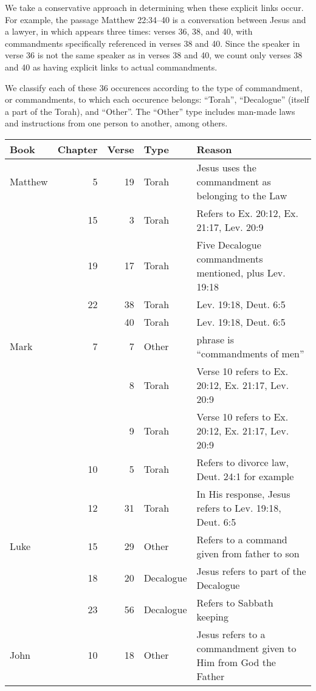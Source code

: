 \documentclass{article}
\newcommand{\entole}{\textepsilon\textnu\texttau\textomikron\textlambda\textepsilon\xspace}
\begin{document}
We take a conservative approach in determining when these explicit links
occur.  For example, the passage Matthew 22:34--40 is a conversation between
Jesus and a lawyer, in which \entole appears three times: verses 36, 38, and 40,
with commandments specifically referenced in verses 38 and 40.  Since the
speaker in verse 36 is not the same speaker as in verses 38 and 40, we count
only verses 38 and 40 as having explicit links to actual commandments.

We classify each of these 36 occurences according to the type of commandment,
or commandments,
to which each occurence belongs: ``Torah'', ``Decalogue'' (itself a part
of the Torah), and ``Other''.  The ``Other'' type includes man-made laws
and instructions from one person to another, among others.

\begin{table}
    \centering
    \footnotesize
    \renewcommand\arraystretch{1}
    \begin{tabularx}{\textwidth+40pt}{@{}lrrlX@{}}
    \toprule
    Book & Chapter & Verse & Type & Reason \\
    \midrule
    Matthew & 5&19 & Torah & Jesus uses the commandment as belonging to the Law \\
    &15&3 & Torah & Refers to Ex. 20:12, Ex. 21:17, Lev. 20:9 \\
    &19&17 & Torah & Five Decalogue commandments mentioned, plus Lev. 19:18 \\
    &22&38 & Torah & Lev. 19:18, Deut. 6:5\\
    & &40 & Torah & Lev. 19:18, Deut. 6:5\\
    Mark&7&7 & Other & phrase is ``commandments of men'' \\
    & &8 & Torah & Verse 10 refers to Ex. 20:12, Ex. 21:17, Lev. 20:9\\
    & &9 & Torah & Verse 10 refers to Ex. 20:12, Ex. 21:17, Lev. 20:9\\
    &10&5 & Torah & Refers to divorce law, Deut. 24:1 for example\\
    &12&31 & Torah & In His response, Jesus refers to Lev. 19:18, Deut. 6:5\\
    Luke&15&29 & Other & Refers to a command given from father to son\\
    &18&20 & Decalogue & Jesus refers to part of the Decalogue\\
    &23&56 & Decalogue & Refers to Sabbath keeping\\
    John&10&18 & Other & Jesus refers to a commandment given to Him from God the Father\\

\end{tabularx}
\end{table}
\end{document}
